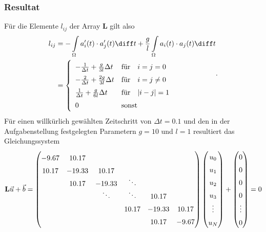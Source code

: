 \subsubsection{Resultat}
Für die Elemente $l_{ij}$ der Array $\mathbf{L}$ gilt also
\begin{equation}
    \begin{aligned}
        l_{ij} 
        &= - \int\limits_\Omega a_i'(t) \cdot a_j'(t) \diff t + \frac{g}{l} \int\limits_\Omega a_i(t) \cdot a_j(t) \diff t \\
        &=  \left\{ 
                \begin{array}{ll}
                    - \frac{1}{\Delta t} + \frac{g}{3l} \Delta t & \text{für} \quad i = j = 0 \\
                    - \frac{2}{\Delta t} + \frac{2g}{3l} \Delta t & \text{für} \quad i = j \neq 0 \\
                    \frac{1}{\Delta t} + \frac{g}{6l} \Delta t & \text{für} \quad |i - j| = 1 \\
                    0 & \text{sonst}
                \end{array} 
            \right.
    \end{aligned}.
\end{equation}
Für einen willkürlich gewählten Zeitschritt von $\Delta t = 0.1$ und den in der Aufgabenstellung festgelegten Parametern $g = 10$ und $l = 1$ resultiert das Gleichungssystem
\begin{equation}
    \def\arraystretch{1.5}
    \mathbf{L}\vec{u} + \vec{b} 
    = \begin{pmatrix}
         -9.67  & 10.17  &                &                &        &        \\
         10.17  &-19.33  & 10.17          &                &        &        \\
                & 10.17  &-19.33          & \smash{\ddots} &        &        \\
                &        & \smash{\ddots} & \smash{\ddots} & 10.17  &        \\
                &        &                & 10.17          &-19.33  & 10.17  \\
                &        &                &                & 10.17  & -9.67
    \end{pmatrix}
    \begin{pmatrix}
        u_0 \\ u_1 \\ u_2 \\ u_3 \\ \vdots \\ u_N
    \end{pmatrix}
    +
    \begin{pmatrix}
        0 \\ 0 \\ 0 \\ 0 \\ \vdots \\ 0
    \end{pmatrix}
    = 0
    \label{fem:rechenbsp:gleichungssystem}
\end{equation}


